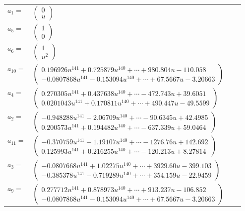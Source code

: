 \documentclass[1p]{elsarticle_modified}
\theoremstyle{definition}
\begin{document}
\begin{tabular}{m{7pt} m{180pt} m{7pt} m{180pt} }
\flushright $a_{1}=$&$\begin{pmatrix}0\\u\end{pmatrix}$ \\
\flushright $a_{5}=$&$\begin{pmatrix}1\\0\end{pmatrix}$ \\
\flushright $a_{6}=$&$\begin{pmatrix}1\\u^2\end{pmatrix}$ \\
\flushright $a_{10}=$&$\begin{pmatrix}0.196926 u^{141}+0.725879 u^{140}+\cdots+980.804 u-110.058\\-0.0807868 u^{141}-0.153094 u^{140}+\cdots+67.5667 u-3.20663\end{pmatrix}$ \\
\flushright $a_{4}=$&$\begin{pmatrix}0.270305 u^{141}+0.437638 u^{140}+\cdots-472.743 u+39.6051\\0.0201043 u^{141}+0.170811 u^{140}+\cdots+490.447 u-49.5599\end{pmatrix}$ \\
\flushright $a_{2}=$&$\begin{pmatrix}-0.948288 u^{141}-2.06709 u^{140}+\cdots-90.6345 u+42.4985\\0.200573 u^{141}+0.194482 u^{140}+\cdots-637.339 u+59.0464\end{pmatrix}$ \\
\flushright $a_{11}=$&$\begin{pmatrix}-0.370759 u^{141}-1.19107 u^{140}+\cdots-1276.76 u+142.692\\0.125993 u^{141}+0.216255 u^{140}+\cdots-120.213 u+8.27814\end{pmatrix}$ \\
\flushright $a_{3}=$&$\begin{pmatrix}-0.0807668 u^{141}+1.02275 u^{140}+\cdots+3929.60 u-399.103\\-0.385378 u^{141}-0.719289 u^{140}+\cdots+354.159 u-22.9459\end{pmatrix}$ \\
\flushright $a_{9}=$&$\begin{pmatrix}0.277712 u^{141}+0.878973 u^{140}+\cdots+913.237 u-106.852\\-0.0807868 u^{141}-0.153094 u^{140}+\cdots+67.5667 u-3.20663\end{pmatrix}$ \\

\end{tabular}
\end{document}
